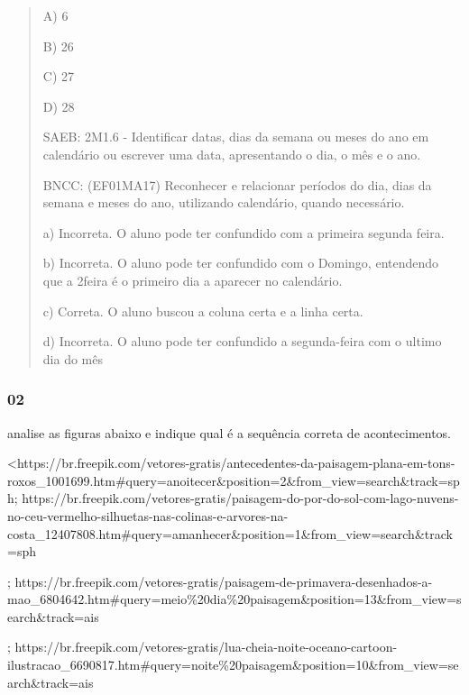 \begin{quote}
A) 6

B) 26

C) 27

D) 28

SAEB: 2M1.6 - Identificar datas, dias da semana ou meses do ano em
calendário ou escrever uma data, apresentando o dia, o mês e o ano.

BNCC: (EF01MA17) Reconhecer e relacionar períodos do dia, dias da semana
e meses do ano, utilizando calendário, quando necessário.

a) Incorreta. O aluno pode ter confundido com a primeira segunda feira.

b) Incorreta. O aluno pode ter confundido com o Domingo, entendendo que
a 2feira é o primeiro dia a aparecer no calendário.

c) Correta. O aluno buscou a coluna certa e a linha certa.

d) Incorreta. O aluno pode ter confundido a segunda-feira com o ultimo
dia do mês
\end{quote}

\subsubsection{02}\label{section-52}

analise as figuras abaixo e indique qual é a sequência correta de
acontecimentos.

\textless{}https://br.freepik.com/vetores-gratis/antecedentes-da-paisagem-plana-em-tons-roxos\_1001699.htm\#query=anoitecer\&position=2\&from\_view=search\&track=sph;
https://br.freepik.com/vetores-gratis/paisagem-do-por-do-sol-com-lago-nuvens-no-ceu-vermelho-silhuetas-nas-colinas-e-arvores-na-costa\_12407808.htm\#query=amanhecer\&position=1\&from\_view=search\&track=sph

;
https://br.freepik.com/vetores-gratis/paisagem-de-primavera-desenhados-a-mao\_6804642.htm\#query=meio\%20dia\%20paisagem\&position=13\&from\_view=search\&track=ais

;
https://br.freepik.com/vetores-gratis/lua-cheia-noite-oceano-cartoon-ilustracao\_6690817.htm\#query=noite\%20paisagem\&position=10\&from\_view=search\&track=ais

